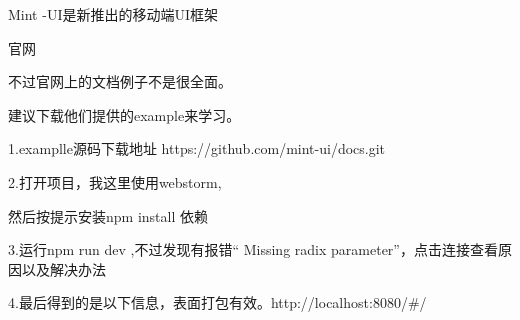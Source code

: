 Mint -UI是新推出的移动端UI框架

官网

不过官网上的文档例子不是很全面。

建议下载他们提供的example来学习。

1.examplle源码下载地址   https://github.com/mint-ui/docs.git

2.打开项目，我这里使用webstorm,

然后按提示安装npm install 依赖

3.运行npm run dev ,不过发现有报错“ Missing radix parameter”，点击连接查看原因以及解决办法


4.最后得到的是以下信息，表面打包有效。http://localhost:8080/#/